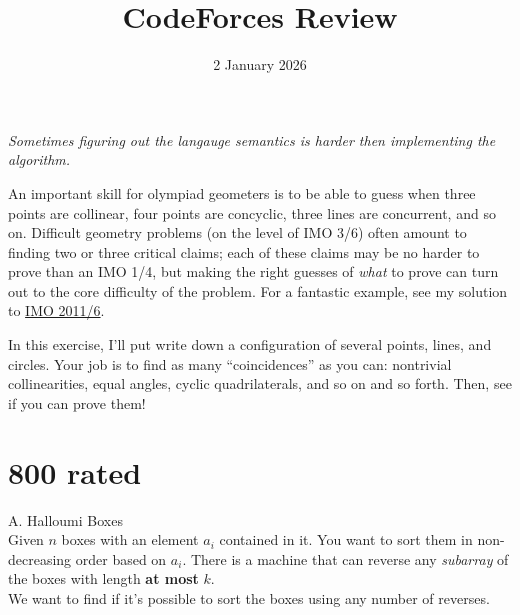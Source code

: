 \documentclass[11pt]{scrartcl}
\begin{document}
\title{CodeForces Review}
\date{2 January 2026}
\maketitle

\begin{center}
  \itshape
  Sometimes figuring out the langauge semantics is harder then implementing the algorithm.
\end{center}

An important skill for olympiad geometers is to be able to guess when three points are collinear,
four points are concyclic, three lines are concurrent, and so on.
Difficult geometry problems (on the level of IMO 3/6) often amount to finding two or three critical claims;
each of these claims may be no harder to prove than an IMO 1/4, but making the right guesses of \emph{what} to prove
can turn out to the core difficulty of the problem.
For a fantastic example, see my solution to
\href{http://www.aops.com/community/c6h418983p3518149}{IMO 2011/6}.

In this exercise, I'll put write down a configuration of several points, lines, and circles.
Your job is to find as many ``coincidences'' as you can: nontrivial collinearities, equal angles,
cyclic quadrilaterals, and so on and so forth.
Then, see if you can prove them!

\tableofcontents

\newpage

\section{800 rated}
\begin{problem}
    A. Halloumi Boxes \\

    Given $n$ boxes with an element $a_i$ contained in it. You want to sort them in non-decreasing order based on $a_i$. There is a machine that can reverse any \emph{subarray} of the boxes 
    with length \textbf{at most} $k$. \\

    We want to find if it's possible to sort the boxes using any number of reverses.
\end{problem}
\end{document}
